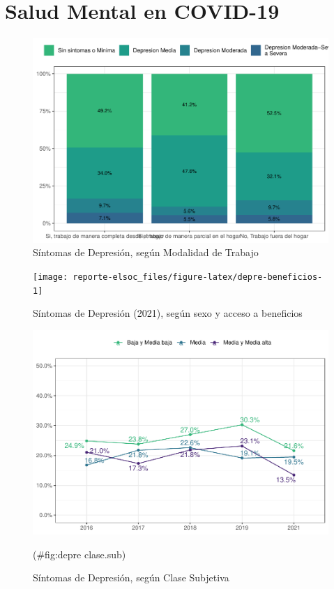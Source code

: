 \documentclass[
  12pt,
  openany]{book}
\begin{document}
\hypertarget{salud-mental-en-covid-19}{%
\section{Salud Mental en COVID-19}\label{salud-mental-en-covid-19}}

\begin{figure}

{\centering \includegraphics{reporte-elsoc_files/figure-latex/depre-teletrabajo-1} 

}

\caption{Síntomas de Depresión, según Modalidad de Trabajo}\label{fig:depre-teletrabajo}
\end{figure}

\begin{figure}

{\centering \texttt{[image: reporte-elsoc\_files/figure-latex/depre-beneficios-1]} 

}

\caption{Síntomas de Depresión (2021), según sexo y acceso a beneficios}\label{fig:depre-beneficios}
\end{figure}

\begin{figure}

{\centering \includegraphics{reporte-elsoc_files/figure-latex/depre clase.sub-1} 

}

\caption{Síntomas de Depresión, según Clase Subjetiva}(\#fig:depre clase.sub)
\end{figure}
\end{document}
